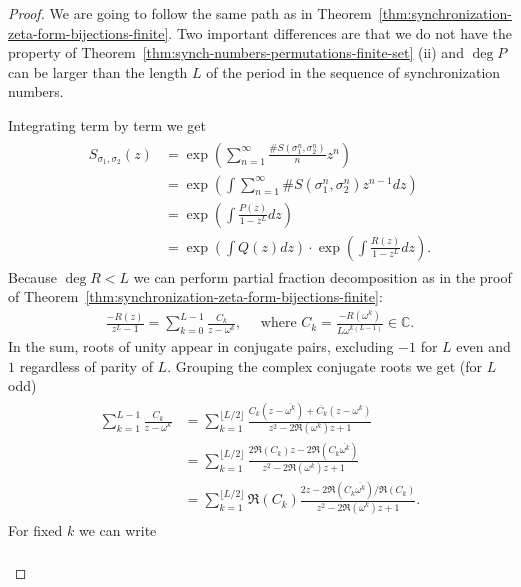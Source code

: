 \documentclass[oneside]{amsart}
\def\C{\mathbb{C}}
\begin{document}
\begin{proof}
  We are going to follow the same path as in Theorem~\ref{thm:synchronization-zeta-form-bijections-finite}.
  Two important differences are that we do not have the property of Theorem~\ref{thm:synch-numbers-permutations-finite-set} (ii)
  and $\deg P$ can be larger than the length $L$ of the period in the sequence of synchronization numbers.

  Integrating term by term we get
  \begin{align*}
  \begin{split}
    S_{\sigma_1, \sigma_2}(z) &= \exp \left( \sum_{n=1}^\infty \frac{\# S(\sigma_1^n, \sigma_2^n)}{n} z^n \right) \\
    &= \exp \left( \int \sum_{n=1}^\infty \# S(\sigma_1^n, \sigma_2^n) z^{n-1} dz \right) \\
    &= \exp \left( \int \frac{P(z)}{1-z^L} dz \right) \\
    &= \exp \left( \int Q(z) dz \right) \cdot \exp \left( \int \frac{R(z)}{1-z^L} dz \right).
  \end{split}
  \end{align*}
  Because $\deg R < L$ we can perform partial fraction decomposition as in the proof
  of Theorem~\ref{thm:synchronization-zeta-form-bijections-finite}:
  \begin{align*}
    \frac{-R(z)}{z^L-1} = \sum_{k=0}^{L-1} \frac{C_k}{z-\omega^k}, \quad \text{ where } C_k = \frac{-R(\omega^k)}{L\omega^{k(L-1)}} \in \C.
  \end{align*}
  In the sum, roots of unity appear in conjugate pairs, excluding $-1$ for $L$ even and $1$ regardless of parity of $L$.
  Grouping the complex conjugate roots we get (for $L$ odd)
  \begin{align*}
  \begin{split}
    \sum_{k=1}^{L-1} \frac{C_k}{z-\omega^k} &= \sum_{k=1}^{\lfloor L/2 \rfloor}
      \frac{C_k(z-\overline{\omega^k})+\overline{C_k}(z-\omega^k)}{z^2 - 2\Re(\omega^k)z +1} \\
    &= \sum_{k=1}^{\lfloor L/2 \rfloor} \frac{2\Re(C_k)z - 2\Re(C_k\overline{\omega^k})}{z^2 - 2\Re(\omega^k)z +1} \\
    &= \sum_{k=1}^{\lfloor L/2 \rfloor} \Re(C_k) \frac{2z - 2\Re(C_k\overline{\omega^k})/\Re(C_k)}{z^2 - 2\Re(\omega^k)z +1}.
  \end{split}
  \end{align*}
  For fixed $k$ we can write
  \begin{align*}
  \begin{split}

\end{split}
\end{align*}
\end{proof}
\end{document}
